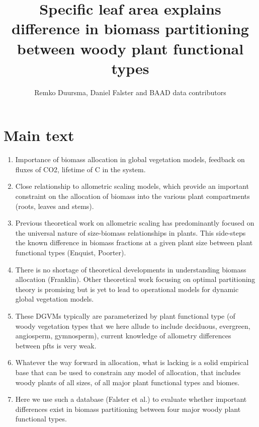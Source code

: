 \documentclass[a4paper]{article}
\begin{document}
\title{Specific leaf area explains difference in biomass partitioning between woody plant functional types}

\author{Remko Duursma, Daniel Falster and BAAD data contributors}

\maketitle



\section{Main text}

\begin{enumerate}
  \item Importance of biomass allocation in global vegetation models, feedback on fluxes of CO2, lifetime of C in the system. 
  \item Close relationship to allometric scaling models, which provide an important constraint on the allocation of biomass into the various plant compartments (roots, leaves and stems).
  \item Previous theoretical work on allometric scaling has predominantly focused on the universal nature of size-biomass relationships in plants. This side-steps the known difference in biomass fractions at a given plant size between plant functional types (Enquist, Poorter).
  \item There is no shortage of theoretical developments in understanding biomass allocation (Franklin). Other theoretical work focusing on optimal partitioning theory is promising but is yet to lead to operational models for dynamic global vegetation models.
  \item These DGVMs typically are parameterized by plant functional type (of woody vegetation types that we here allude to include deciduous, evergreen, angiosperm, gymnosperm), current knowledge of allometry differences between pfts is very weak.
  \item Whatever the way forward in allocation, what is lacking is a solid empirical base that can be used to constrain any model of allocation, that includes woody plants of all sizes, of all major plant functional types and biomes.
  \item Here we use such a database (Falster et al.) to evaluate whether important differences exist in biomass partitioning between four major woody plant functional types.

\end{enumerate}
\end{document}
